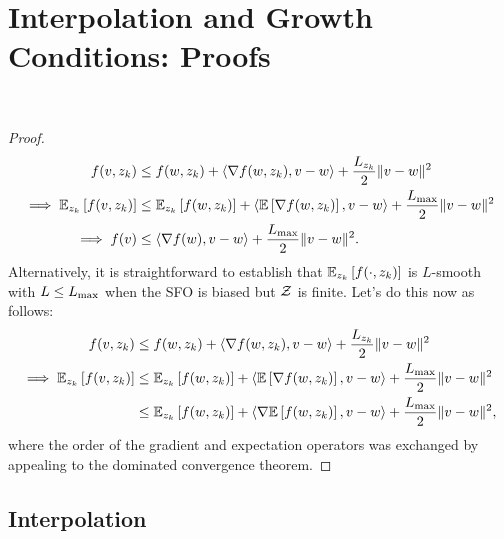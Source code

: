 
\section{Interpolation and Growth Conditions: Proofs}~\label{app:interpolation-gc}

\indSmoothToSmooth*
\begin{proof}
\begin{align*}
    f(v, z_{k}) &\leq f(w, z_{k}) + \left\langle\nabla f(w, z_{k}), v - w\right\rangle + \frac{L_{z_{k}}}{2} \|v - w\|^2\\
    \implies \mathbb{E}_{z_{k}} \left[f(v, z_{k})\right] &\leq \mathbb{E}_{z_{k}} \left[f(w, z_{k})\right] + \left\langle\mathbb{E}\left[\nabla f(w, z_{k})\right], v - w\right\rangle + \frac{L_{\text{max}}}{2} \|v - w\|^2\\
    \implies f(v) &\leq \left\langle\nabla f(w), v - w\right\rangle + \frac{L_{\text{max}}}{2}\|v - w\|^2. 
\end{align*}
Alternatively, it is straightforward to establish that \( \mathbb{E}_{z_{k}} \left[f(\cdot, z_{k})\right] \) is \( L \)-smooth with \( L \leq L_{\text{max}} \) when the SFO is biased but \( \mathcal{Z} \) is finite.
Let's do this now as follows:
\begin{align*}
    f(v, z_{k}) &\leq f(w, z_{k}) + \left\langle\nabla f(w, z_{k}), v - w\right\rangle + \frac{L_{z_{k}}}{2} \|v - w\|^2\\
    \implies \mathbb{E}_{z_{k}} \left[f(v, z_{k})\right] &\leq \mathbb{E}_{z_{k}} \left[f(w, z_{k})\right] + \left\langle\mathbb{E}\left[\nabla f(w, z_{k})\right], v - w\right\rangle + \frac{L_{\text{max}}}{2} \|v - w\|^2\\
                                 &\leq \mathbb{E}_{z_{k}} \left[f(w, z_{k})\right] + \left\langle\nabla \mathbb{E}\left[f(w, z_{k})\right], v - w\right\rangle + \frac{L_{\text{max}}}{2} \|v - w\|^2,
\end{align*}
where the order of the gradient and expectation operators was exchanged by appealing to the dominated convergence theorem.
\end{proof}

\subsection{Interpolation}~\label{app:interpolation}

